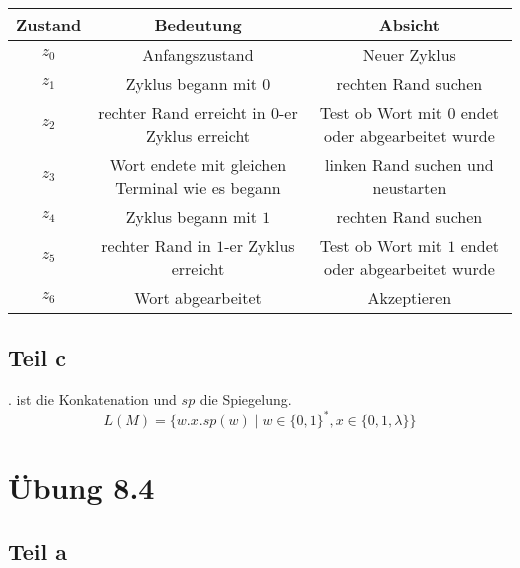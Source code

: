 \documentclass[10pt,a4paper]{article}
\begin{document}
\begin{tabular}{c|c|c}
  Zustand & Bedeutung & Absicht\\\hline
  $z_{0}$ & Anfangszustand & Neuer Zyklus\\\hline
  $z_{1}$ & Zyklus begann mit $0$ & rechten Rand suchen\\\hline
  $z_{2}$ & rechter Rand erreicht in $0$-er Zyklus erreicht & Test ob Wort mit $0$ endet oder abgearbeitet wurde\\\hline
  $z_{3}$ & Wort endete mit gleichen Terminal wie es begann & linken Rand suchen und neustarten\\\hline
  $z_{4}$ & Zyklus begann mit $1$ & rechten Rand suchen\\\hline
  $z_{5}$ & rechter Rand in $1$-er Zyklus erreicht & Test ob Wort mit $1$ endet oder abgearbeitet wurde\\\hline
  $z_{6}$ & Wort abgearbeitet & Akzeptieren
\end{tabular}

\subsection{Teil c}

$.$ ist die Konkatenation und $sp$ die Spiegelung.
\begin{equation}
  L(M) = \{ w . x . sp(w) \mid w \in \{ 0, 1 \}^{*}, x \in \{ 0, 1, \lambda \} \}
\end{equation}

\section{Übung 8.4}

\subsection{Teil a}
\end{document}
